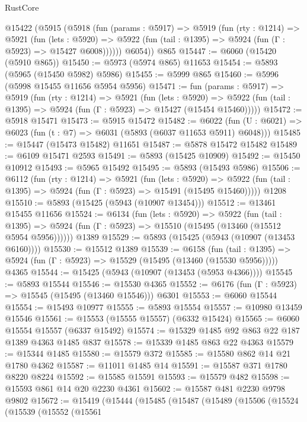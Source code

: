 \begin{lexlean}{RustCore}
\begin{coremodule}
    @15422
      (@5915
        (@5918
          (fun (params : @5917) =>
          @5919
            (fun (rty : @1214) =>
            @5921
              (fun (lets : @5920) =>
              @5922 (fun (tail : @1395) => @5924 (fun (Γ : @5923) => @15427 @6008))))))
        @6054))
    @865
@15447 := @6060 (@15420 (@5910 @865))
@15450 := @5973 (@5974 @865) @11653
@15454 := @5893 (@5965 (@15450 @5982) @5986)
@15455 := @5999 @865
@15460 := @5996 (@5998 @15455 @11656 @5954 @5956)
@15471 := fun (params : @5917) =>
  @5919
    (fun (rty : @1214) =>
    @5921
      (fun (lets : @5920) =>
      @5922 (fun (tail : @1395) => @5924 (fun (Γ : @5923) => @15427 (@15454 @15460)))))
@15472 := @5918 @15471
@15473 := @5915 @15472
@15482 := @6022
    (fun (U : @6021) => @6023 (fun (t : @7) => @6031 (@5893 (@6037 @11653 @5911) @6048)))
@15485 := @15447 (@15473 @15482) @11651
@15487 := @5878 @15472 @15482
@15489 := @6109 @15471 @2593
@15491 := @5893 (@15425 @10909)
@15492 := @15450 @10912
@15493 := @5965 @15492
@15495 := @5893 (@15493 @5986)
@15506 := @6112
    (fun (rty : @1214) =>
    @5921
      (fun (lets : @5920) =>
      @5922 (fun (tail : @1395) => @5924 (fun (Γ : @5923) => @15491 (@15495 @15460)))))
    @1208
@15510 := @5893 (@15425 (@5943 (@10907 @13454)))
@15512 := @13461 @15455 @11656
@15524 := @6134
    (fun (lets : @5920) =>
    @5922
      (fun (tail : @1395) =>
      @5924 (fun (Γ : @5923) => @15510 (@15495 (@13460 (@15512 @5954 @5956))))))
    @1389
@15529 := @5893 (@15425 (@5943 (@10907 (@13453 @6160))))
@15530 := @15512 @1389
@15539 := @6158
    (fun (tail : @1395) => @5924 (fun (Γ : @5923) => @15529 (@15495 (@13460 (@15530 @5956)))))
    @4365
@15544 := @15425 (@5943 (@10907 (@13453 (@5953 @4366))))
@15545 := @5893 @15544
@15546 := @15530 @4365
@15552 := @6176 (fun (Γ : @5923) => @15545 (@15495 (@13460 @15546))) @6301
@15553 := @6060 @15544
@15554 := @15493 @10977
@15555 := @5893 @15554
@15557 := @10980 @13459 @15546
@15561 := @15553 (@15555 @15557) (@6332 @15424)
@15565 := @6060 @15554 @15557 (@6337 @15492)
@15574 := @15329 @1485 @92 @863 @22 @187 @1389 @4363 @1485 @837
@15578 := @15339 @1485 @863 @22 @4363
@15579 := @15344 @1485
@15580 := @15579 @372
@15585 := @15580 @862 @14 @21 @1780 @4362
@15587 := @11011 @1485 @14
@15591 := @15587 @371 @1780 @8220 @8224
@15592 := @15585 @15591
@15593 := @15579 @482
@15598 := @15593 @861 @14 @20 @2230 @4361
@15602 := @15587 @481 @2230 @9798 @9802
@15672 := @15419
    (@15444
      (@15485
        (@15487
          (@15489
            (@15506
              (@15524
                (@15539
                  (@15552
                    (@15561

\end{coremodule}
\end{lexlean}
